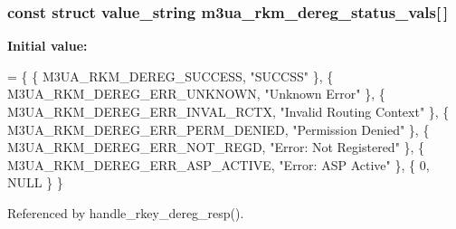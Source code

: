 \subsubsection[{m3ua\+\_\+rkm\+\_\+dereg\+\_\+status\+\_\+vals}]{\setlength{\rightskip}{0pt plus 5cm}const struct value\+\_\+string m3ua\+\_\+rkm\+\_\+dereg\+\_\+status\+\_\+vals[$\,$]}\label{xua__rkm_8c_a517b691866d2bf1ab9a24ac08ee120fc}
{\bfseries Initial value\+:}
\begin{DoxyCode}
= \{
        \{ M3UA_RKM_DEREG_SUCCESS,               \textcolor{stringliteral}{"SUCCSS"} \},
        \{ M3UA_RKM_DEREG_ERR_UNKNOWN,           \textcolor{stringliteral}{"Unknown Error"} \},
        \{ M3UA_RKM_DEREG_ERR_INVAL_RCTX,        \textcolor{stringliteral}{"Invalid Routing Context"} \},
        \{ M3UA_RKM_DEREG_ERR_PERM_DENIED,       \textcolor{stringliteral}{"Permission Denied"} \},
        \{ M3UA_RKM_DEREG_ERR_NOT_REGD,          \textcolor{stringliteral}{"Error: Not Registered"} \},
        \{ M3UA_RKM_DEREG_ERR_ASP_ACTIVE,        \textcolor{stringliteral}{"Error: ASP Active"} \},
        \{ 0, NULL \}
\}
\end{DoxyCode}


Referenced by handle\+\_\+rkey\+\_\+dereg\+\_\+resp().

